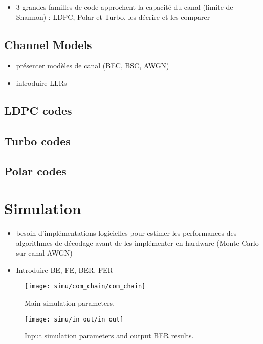 \begin{itemize}
  \item 3 grandes familles de code approchent la capacité du canal (limite de
    Shannon) : LDPC, Polar et Turbo, les décrire et les comparer
\end{itemize}

\subsection{Channel Models}

\begin{itemize}
  \item présenter modèles de canal (BEC, BSC, AWGN)
  \item introduire LLRs
\end{itemize}

\subsection{LDPC codes}

\subsection{Turbo codes}

\subsection{Polar codes}

\section{Simulation}

\begin{itemize}
  \item besoin d'implémentations logicielles pour estimer les performances des
    algorithmes de décodage avant de les implémenter en hardware (Monte-Carlo
    sur canal AWGN)
  \item Introduire BE, FE, BER, FER
\end{itemize}

\begin{figure}[htp]
  \centering
  \texttt{[image: simu/com\_chain/com\_chain]}
  \caption{Main simulation parameters.}
  \label{fig:simu_com_chain}
\end{figure}

\begin{figure}[htp]
  \centering
  \texttt{[image: simu/in\_out/in\_out]}
  \caption{Input simulation parameters and output BER results.}
  \label{fig:intro_in_out}
\end{figure}

